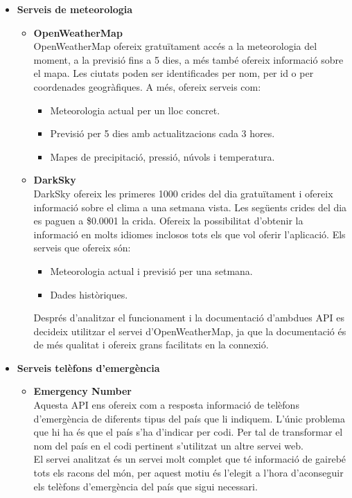 \begin{itemize}
\item[]\textbf{Serveis de meteorologia}
\begin{itemize}
\item{}\textbf{OpenWeatherMap}\\
OpenWeatherMap ofereix gratuïtament accés a la meteorologia del
moment, a la previsió fins a 5 dies, a més també ofereix informació
sobre el mapa. Les ciutats poden ser identificades per nom, per id o
per coordenades geogràfiques. A més, ofereix serveis com:
\begin{itemize}
\item{}Meteorologia actual per un lloc concret.
\item{}Previsió per 5 dies amb actualitzacions cada 3 hores.
\item{}Mapes de precipitació, pressió, núvols i temperatura.
\end{itemize}
\item{}\textbf{DarkSky}\\
DarkSky ofereix les primeres 1000 crides del dia gratuïtament i ofereix informació sobre el clima a una setmana vista. Les següents crides del dia es paguen a \$0.0001 la crida. Ofereix la possibilitat d'obtenir la informació en molts idiomes inclosos tots els que vol oferir
l'aplicació. Els serveis que ofereix són:
\begin{itemize}
\item{}Meteorologia actual i previsió per una setmana.
\item{}Dades històriques.
\end{itemize}

Després d'analitzar el funcionament i la documentació d'ambdues
API es decideix utilitzar el servei d'OpenWeatherMap, ja que la documentació és de més qualitat i ofereix grans facilitats en la connexió.

\end{itemize}

\item[]\textbf{Serveis telèfons d'emergència}
\begin{itemize}
\item{}\textbf{Emergency Number}\\
Aquesta API ens ofereix com a resposta informació de telèfons d'emergència de diferents tipus del país que li indiquem. L'únic problema que hi ha és que el país s'ha d'indicar per codi. Per tal de transformar el nom del país en el codi pertinent s'utilitzat un altre servei web.\\

El servei analitzat és un servei molt complet que té informació de
gairebé tots els racons del món, per aquest motiu és l'elegit a l'hora
d'aconseguir els telèfons d'emergència del país que sigui necessari.

\end{itemize}
\end{itemize}

